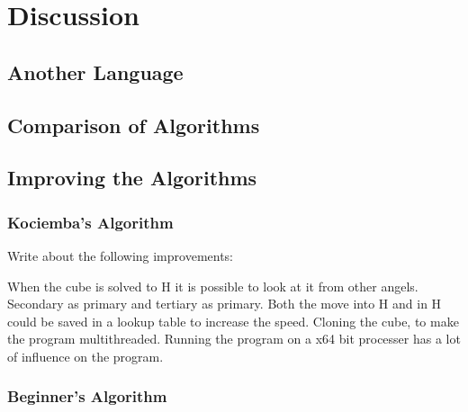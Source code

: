 \chapter{Discussion}

\section{Another Language}

\section{Comparison of Algorithms}

\section{Improving the Algorithms}

\subsection{Kociemba's Algorithm}
Write about the following improvements:

When the cube is solved to H it is possible to look at it from other angels. Secondary as primary and tertiary as primary.
Both the move into H and in H could be saved in a lookup table to increase the speed.
Cloning the cube, to make the program multithreaded.
Running the program on a x64 bit processer has a lot of influence on the program. 

\subsection{Beginner's Algorithm}
